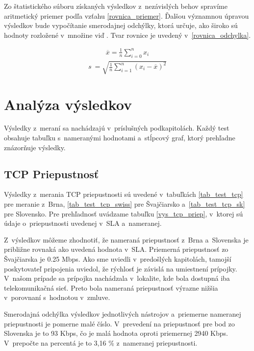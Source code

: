         Zo štatistického súboru získaných výsledkov z~nezávislých behov 
        spravíme aritmetický priemer podľa vzťahu \ref{rovnica_priemer}.
        Ďalšou významnou úpravou výsledkov 
        bude vypočítanie smerodajnej odchýlky, ktorá určuje, ako široko sú
        hodnoty rozložené v~množine viď \cite{statistika}. Tvar rovnice je
        uvedený v~\ref{rovnica_odchylka}.

        \begin{eqnarray} \label{rovnica_priemer}
            \overline{x} = \frac{1}{n} \sum_{i=0}^n x_{i}
        \end{eqnarray}
        \begin{eqnarray} \label{rovnica_odchylka}
            s~= \sqrt{\frac{1}{n} \sum_{i=1}^n (x_{i} - \overline{x})^2}
        \end{eqnarray}

    \section{Analýza výsledkov} \label{test_vys}
    Výsledky z~meraní sa nachádzajú v~príslušných podkapitolách. Každý test
    obsahuje tabuľku s~nameranými hodnotami a~stĺpcový graf, ktorý prehľadne
    znázorňuje výsledky. 

        \subsection{TCP Priepustnosť} \label{test_vys_tcp}
        Výsledky z~merania TCP priepustnosti sú uvedené v~tabuľkách
        \ref{tab_test_tcp} pre meranie z~Brna,
        \ref{tab_test_tcp_swiss} pre Švajčiarsko a~\ref{tab_test_tcp_sk} pre
        Slovensko. Pre
        prehľadnosť uvádzame tabuľku \ref{vys_tcp_priep}, v~ktorej sú údaje 
        o~priepustnosti uvedenej v~SLA a~nameranej. 
        
        Z~výsledkov môžeme zhodnotiť, že nameraná priepustnosť z~Brna
        a~Slovenska je približne rovnaká ako uvedená hodnota v~SLA. 
        Priemerná 
        priepustnosť zo Švajčiarska je 0.25 Mbps. Ako sme uviedli v~predošlých
        kapitolách, tamojší poskytovateľ pripojenia uviedol, že rýchlosť je 
        závislá na umiestnení prípojky. V~našom prípade sa prípojka nachádzala
        v~lokalite, 
        kde bola dostupná iba telekomunikačná sieť. Preto bola nameraná
        priepustnosť výrazne nižšia v~porovnaní s~hodnotou v~zmluve.
        
        Smerodajná odchýlka výsledkov jednotlivých nástrojov a~priemerne
        nameranej priepustnosti je pomerne malé číslo. V~prevedení na
        priepustnosť pre bod zo Slovenska je to 93 Kbps, čo je malá hodnota
        oproti priemernej 2940 Kbps. V~prepočte na percentá je to 3,16 \%
        z~nameranej priepustnosti.

